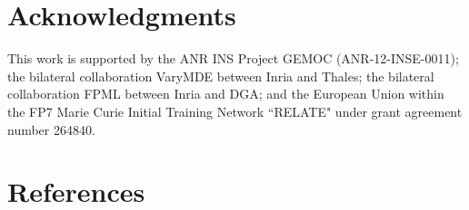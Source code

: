 \documentclass[preprint,5p]{elsarticle}
\begin{document}





%



\section*{Acknowledgments}
This work is supported by the ANR INS Project GEMOC (ANR-12-INSE-0011); the bilateral collaboration VaryMDE between Inria and Thales; the bilateral collaboration FPML between Inria and DGA; and the European Union within the FP7 Marie Curie Initial Training Network “RELATE" under grant agreement number 264840. 
\section*{References}


\end{document}
